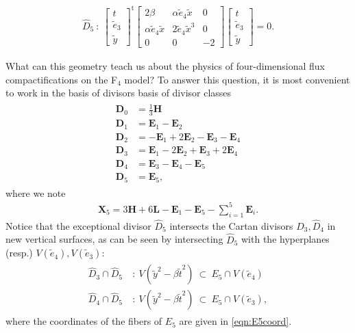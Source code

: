 \documentclass[11pt,oneside,english]{article}
\numberwithin{equation}{section}
\theoremstyle{definition}
\begin{document}
	\begin{align}
		\hat D_5 ~:~\begin{bmatrix} t \\ \tilde e_3 \\ \tilde y \end{bmatrix}^{\mathrm t} \begin{bmatrix} 2 \beta&\alpha \tilde e_4 \tilde x & 0 \\ \alpha \tilde e_4 \tilde x & 2 \tilde e_4 \tilde x^3 & 0 \\ 0 & 0 &-2 \end{bmatrix}  \begin{bmatrix} t \\ \tilde e_3 \\ \tilde y \end{bmatrix} = 0.
	\end{align}


What can this geometry teach us about the physics of four-dimensional flux compactifications on the F$_4$ model? To answer this question, it is most convenient to work in the basis of divisors
basis of divisor classes
	\begin{align}
		\begin{split}
		\label{eqn:F4Dbasiscurve}
			\boldsymbol D_0 &= \frac{1}{3} \boldsymbol H \\
			\boldsymbol  D_1 &= \boldsymbol E_1 - \boldsymbol E_2 \\
			\boldsymbol D_2 &= -\boldsymbol E_1 + 2 \boldsymbol E_2 - \boldsymbol E_3 - \boldsymbol E_4\\
			\boldsymbol D_3 &= \boldsymbol E_1 - 2 \boldsymbol E_2 + \boldsymbol E_3 + 2 \boldsymbol E_4 \\
			\boldsymbol D_4 &= \boldsymbol E_3 - \boldsymbol E_4 -\boldsymbol E_5 \\
			\boldsymbol D_5 & = \boldsymbol E_5,
		\end{split}
	\end{align}
where we note 
	\begin{align}
	 \boldsymbol{X}_5 = 3\boldsymbol{H} + 6\boldsymbol{L}- \boldsymbol{E}_1 - \boldsymbol{E}_5 - \sum_{i=1}^5 \boldsymbol{E}_i.
	\end{align}
Notice that the exceptional divisor $\hat D_5$ intersects the Cartan divisors $\hat D_3, \hat D_4$ in new vertical surfaces, as can be seen by intersecting $\hat D_5$ with the hyperplanes (resp.) $V(\tilde e_4), V(\tilde e_3)$:
	\begin{align}
	\begin{split}
	\label{eqn:codim2newsurface}
		 \hat D_3 \cap \hat D_5 ~&:~ V( \tilde y^2 - \beta \tilde t^2 )~\subset ~ {E}_5 \cap {V(\tilde e_4)}\\
		\hat D_4 \cap \hat D_5 ~&:~V( \tilde y^2 -\beta \tilde t^2 )~\subset ~{E}_5 \cap {V(\tilde e_3 )},
	\end{split}
	\end{align}
where the coordinates of the fibers of ${E}_5$ are given in \cref{eqn:E5coord}. 
\end{document}
